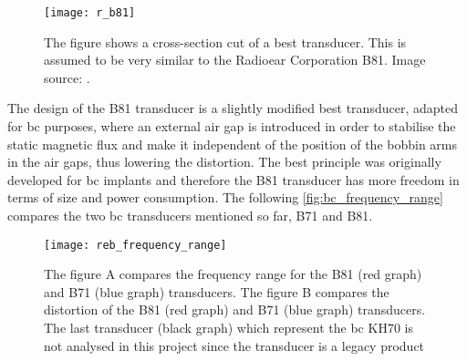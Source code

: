  \begin{figure}[H]
	\centering
		\texttt{[image: r\_b81]}
		\caption{The figure shows a cross-section cut of a \gls{best} transducer. This is assumed to be very similar to the Radioear Corporation B81. Image source:  \citep{the_balanced_2003}.}
		\label{fig:r_b81}
\end{figure}

The design of the B81 transducer is a slightly modified \gls{best} transducer, adapted for \gls{bc} purposes, where an external air gap is introduced in order to stabilise the static magnetic flux and make it independent of the position of the bobbin arms in the air gaps, thus lowering the distortion.  The \gls{best} principle was originally developed for \gls{bc} implants and therefore the B81 transducer has more freedom in terms of size and power consumption. The following \autoref{fig:bc_frequency_range} compares the two \gls{bc} transducers mentioned so far, B71 and B81.


\begin{figure}[H]
	\centering
		\texttt{[image: reb\_frequency\_range]}
		\caption{The figure A compares the frequency range for the B81 (red graph) and B71 (blue graph) transducers. The figure B compares the distortion of the  B81 (red graph) and B71 (blue graph) transducers. The last transducer (black graph) which represent the \gls{bc} KH70 is not analysed in this project since the transducer is a legacy product}
		\label{fig:bc_frequency_distortion}
\end{figure}




